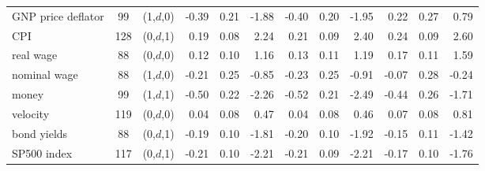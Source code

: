 {{\begin{table}[H]
{\begin{tabular}{l|cc|RRR|RRR|RRR}
GNP price deflator    & 99  & (1,$d$,0) & -0.39                         & 0.21                     & -1.88                    & -0.40                         & 0.20                   & -1.95                    & 0.22                          & 0.27                  & 0.79                    \\
CPI                   & 128 & (0,$d$,1) & 0.19                          & 0.08                     & 2.24                     & 0.21                          & 0.09                   & 2.40                     & 0.24                          & 0.09                   & 2.60                    \\
real wage             & 88  & (0,$d$,0) & 0.12                          & 0.10                     & 1.16                     & 0.13                          & 0.11                   & 1.19                     & 0.17                          & 0.11                   & 1.59                    \\
nominal wage          & 88  & (1,$d$,0) & -0.21                         & 0.25                     & -0.85                    & -0.23                         & 0.25                   & -0.91                    & -0.07                         & 0.28                   & -0.24                   \\
money                 & 99  & (1,$d$,1) & -0.50                         & 0.22                     & -2.26                    & -0.52                         & 0.21                   & -2.49                    & -0.44                         & 0.26                   & -1.71                   \\
velocity              & 119 & (0,$d$,0) & 0.04                          & 0.08                     & 0.47                     & 0.04                          & 0.08                   & 0.46                     & 0.07                          & 0.08                   & 0.81                    \\
bond yields           & 88  & (0,$d$,1) & -0.19                         & 0.10                     & -1.81                    & -0.20                         & 0.10                   & -1.92                    & -0.15                         & 0.11                   & -1.42                   \\
SP500 index           & 117 & (0,$d$,1) & -0.21                         & 0.10                     & -2.21                    & -0.21                         & 0.09                   & -2.21                    & -0.17                         & 0.10                   & -1.76                   \\ \hline

\end{tabular}}
\end{table}}}
